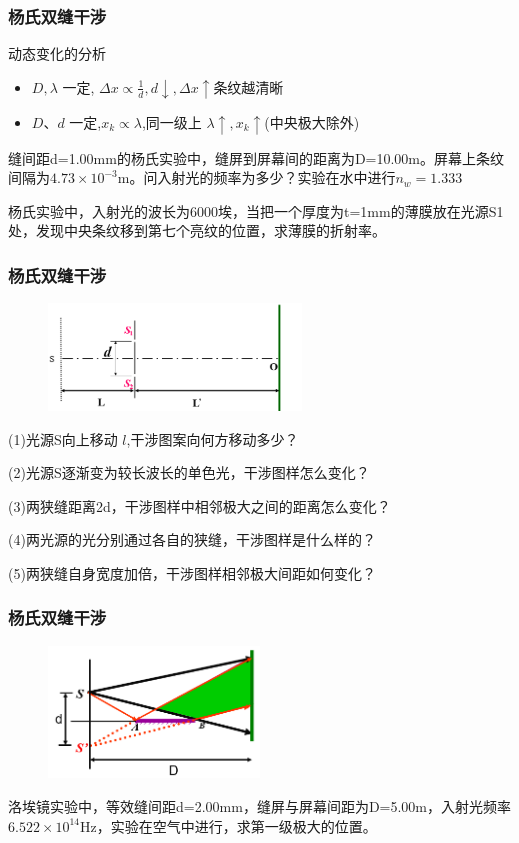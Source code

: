 \documentclass[UTF8]{ctexbeamer}
\begin{document}
\begin{frame}
\frametitle{杨氏双缝干涉}
动态变化的分析
\begin{itemize}
	\item $D,\lambda$ 一定, $\Delta x\propto \frac1d,d\downarrow,\Delta x\uparrow$条纹越清晰
	\item $D\text{、}d$ 一定,$x_k\propto\lambda$,同一级上 $\lambda\uparrow,x_k\uparrow$(中央极大除外)
\end{itemize}
\begin{examples}
	缝间距d=1.00mm的杨氏实验中，缝屏到屏幕间的距离为D=10.00m。屏幕上条纹间隔为$4.73\times 10^{-3}$m。问入射光的频率为多少？实验在水中进行$n_w=1.333$
\end{examples}
\begin{examples}
	杨氏实验中，入射光的波长为6000埃，当把一个厚度为t=1mm的薄膜放在光源S1处，发现中央条纹移到第七个亮纹的位置，求薄膜的折射率。
\end{examples}
\end{frame}
\begin{frame}
\frametitle{杨氏双缝干涉}
\begin{examples}
	\begin{figure}[!ht]
		\centering
		\includegraphics[width=0.6\textwidth]{13}
	\end{figure}
	(1)光源S向上移动 $l$,干涉图案向何方移动多少？
	
	(2)光源S逐渐变为较长波长的单色光，干涉图样怎么变化？
	
	(3)两狭缝距离2d，干涉图样中相邻极大之间的距离怎么变化？
	
	(4)两光源的光分别通过各自的狭缝，干涉图样是什么样的？
	
	(5)两狭缝自身宽度加倍，干涉图样相邻极大间距如何变化？
\end{examples}
\end{frame}
\begin{frame}
	\frametitle{杨氏双缝干涉}
	\begin{examples}
		\begin{figure}[!ht]
			\centering
			\includegraphics[width=0.5\textwidth]{14}
		\end{figure}
		洛埃镜实验中，等效缝间距d=2.00mm，缝屏与屏幕间距为D=5.00m，入射光频率$6.522\times10^{14}$Hz，实验在空气中进行，求第一级极大的位置。
	\end{examples}
\end{frame}
\end{document}
